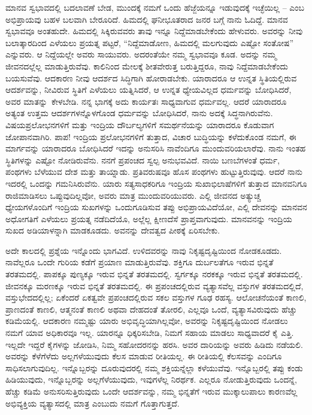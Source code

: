 ಮಾನವ ಸ್ವಭಾವದಲ್ಲಿ ಬದಲಾವಣೆ ಬೇಡ, ಮುಂದಕ್ಕೆ ನಮಗೆ ಒಂದು ಹೆಜ್ಜೆಯನ್ನೂ ಇಡುವುದಕ್ಕೆ ಇಚ್ಛೆಯಿಲ್ಲ – ಎಂಬ ಅಭಿಪ್ರಾಯವು ಬಹಳ ಬಲವಾಗಿ ಬೇರೂರಿದೆ. ಹಿಮದಲ್ಲಿ ಘನೀಭೂತರಾದ ಜನರ ಬಗ್ಗೆ ನಾನು ಓದಿದ್ದೆ. ಮಾನವ ಸ್ವಭಾವವೂ ಅಂತಹುದೇ. ಹಿಮದಲ್ಲಿ ಸಿಕ್ಕಿರುವವರು ತಾವು ಇನ್ನೂ ನಿದ್ದೆಮಾಡಬೇಕೆಂದು ಹೇಳುವರು. ಅವರನ್ನು ನೀವು ಬಲಾತ್ಕಾರದಿಂದ ಎಳೆಯಲು ಪ್ರಯತ್ನ ಪಟ್ಟರೆ, “ನಿದ್ದೆಮಾಡೋಣ, ಹಿಮದಲ್ಲಿ ಮಲಗುವುದು ಎಷ್ಟೋ ಸಂತೋಷ” ಎನ್ನುವರು. ಆ ನಿದ್ದೆಯಲ್ಲೇ ಅವರು ಸಾಯುವರು. ಅದರಂತೆಯೇ ನಮ್ಮ ಸ್ವಭಾವವೂ ಕೂಡ. ಅದನ್ನು ನಮ್ಮ ಜೀವನದಲ್ಲೆಲ್ಲ ಮಾಡುತ್ತಿರುವೆವು. ಕಾಲಿನಿಂದ ಮೇಲಕ್ಕೆ ಶೀತವೇರುತ್ತ ಬರುತ್ತಿದ್ದರೂ, ನಾವು ನಿದ್ದೆಮಾಡಬೇಕೆಂದು ಬಯಸುವೆವು. ಆದಕಾರಣ ನೀವು ಆದರ್ಶದ ಸಿದ್ಧಿಗಾಗಿ ಹೋರಾಡಬೇಕು. ಯಾರಾದರೂ ಆ ಉನ್ನತ ಸ್ಥಿತಿಯಲ್ಲಿರುವ ಆದರ್ಶವನ್ನು, ನೀವಿರುವ ಸ್ಥಿತಿಗೆ ಎಳೆಯಲು ಯತ್ನಿಸಿದರೆ, ಆ ಉನ್ನತ ಧ್ಯೇಯವಿಲ್ಲದ ಧರ್ಮವನ್ನು ಬೋಧಿಸಿದರೆ, ಅವರ ಮಾತನ್ನು\break\ ಕೇಳಬೇಡಿ. ನನ್ನ ಭಾಗಕ್ಕೆ ಅದು ಕಾರ್ಯತಃ ಸಾಧ್ಯವಾಗುವ ಧರ್ಮವಲ್ಲ. ಆದರೆ ಯಾರಾದರೂ ಅತ್ಯಂತ ಉತ್ತಮ ಆದರ್ಶಗಳನ್ನೊಳಗೊಂಡ ಧರ್ಮವನ್ನು ಬೋಧಿಸಿದರೆ, ನಾನು ಅದಕ್ಕೆ ಸಿದ್ಧನಾಗಿರುವೆನು. ವಿಷಯಪ್ರಲೋಭನಗಳಿಗೆ ಮತ್ತು ಇಂದ್ರಿಯ ದೌರ್ಬಲ್ಯಗಳಿಗೆ ಸಮರ್ಥನೆಯನ್ನು ಯಾರಾದರೂ ಕೊಡುವಾಗ ಜೋಪಾನವಾಗಿರಿ. ಪಾಪ! ಇಂದ್ರಿಯ ಪ್ರಲೋಭನಗಳಿಗೆ ತುತ್ತಾದ, ವಿಚಾರ ಬುದ್ಧಿಯನ್ನು ಕಳೆದುಕೊಂಡ ನಮಗೆ, ಈ ಮಾರ್ಗವನ್ನು ಯಾರಾದರೂ ಬೋಧಿಸಿದರೆ ಇದನ್ನು ಅನುಸರಿಸಿ ನಾವೆಂದಿಗೂ ಮುಂದುವರಿಯಲಾರೆವು. ನಾನು ಇಂತಹ ಸ್ಥಿತಿಗಳನ್ನು ಎಷ್ಟೋ ನೋಡಿರುವೆನು. ನನಗೆ ಪ್ರಪಂಚದ ಸ್ವಲ್ಪ ಅನುಭವವಿದೆ. ನಾಯಿ ಬಣಬೆಗಳಂತೆ ಧರ್ಮ, ಪಂಥಗಳು ಬೆಳೆಯುವ ದೇಶ ಮತ್ತು ತಾಯ್ನಾಡು. ಪ್ರತಿವರುಷವೂ ಹೊಸ ಪಂಥಗಳು ಹುಟ್ಟುತ್ತಿರುವುವು. ಆದರೆ ನಾನು ಇದರಲ್ಲಿ ಒಂದನ್ನು ಗಮನಿಸಿರುವೆನು. ಯಾರು ಸತ್ಯಸಾಧಕರಿಗೂ ಇಂದ್ರಿಯ ಸುಖಾಭಿಲಾಷೆಗಳಿಗೆ ತುತ್ತಾದ ಮಾನವನಿಗೂ ರಾಜಿಮಾಡಿಸಲು ಒಪ್ಪುವುದಿಲ್ಲವೋ, ಅವರು ಮಾತ್ರ ಮುಂದುವರಿಯುವರು. ಎಲ್ಲಿ ಜೀವನದ ಅತ್ಯುಚ್ಚ ಧ್ಯೇಯಗಳೊಂದಿಗೆ ಇಂದ್ರಿಯ ಸುಖಗಳನ್ನು ಒಂದುಗೂಡಿಸುವ ತಪ್ಪು ಅಭಿಪ್ರಾಯವಿದೆಯೋ, ಎಲ್ಲಿ ದೇವನನ್ನು ಮಾನವನ ಅಧೋಗತಿಗೆ ಎಳೆಯಲು ಪ್ರಯತ್ನ ನಡೆದಿದೆಯೊ, ಅಲ್ಲೆಲ್ಲ ಕ್ಷೀಣದೆಸೆ ಪ್ರಾಪ್ತವಾಗುವುದು. ಮಾನವನನ್ನು ಇಂದ್ರಿಯ ಸುಖದ ಅಡಿಯಾಳನ್ನಾಗಿ ಮಾಡಕೂಡದು. ಅವನನ್ನು ದೇವತ್ವದ ಪೀಠಕ್ಕೆ ಏರಿಸಬೇಕು. 



ಅದೇ ಕಾಲದಲ್ಲಿ ಪ್ರಶ್ನೆಯ ಇನ್ನೊಂದು ಭಾಗವಿದೆ. ಉಳಿದವರನ್ನು ನಾವು ನಿಕೃಷ್ಟದೃಷ್ಟಿಯಿಂದ ನೋಡಕೂಡದು. ನಾವೆಲ್ಲರೂ ಒಂದೇ ಗುರಿಯ ಕಡೆಗೆ ಪ್ರಯಾಣ ಮಾಡುತ್ತಿರುವೆವು. ಶಕ್ತಿಗೂ ದುರ್ಬಲತೆಗೂ ಇರುವ ಭಿನ್ನತೆ ತರತಮದಲ್ಲಿ. ಪಾಪಕ್ಕೂ ಪುಣ್ಯಕ್ಕೂ ಇರುವ ಭಿನ್ನತೆ ತರತಮದಲ್ಲಿ. ಸ್ವರ್ಗಕ್ಕೂ ನರಕಕ್ಕೂ ಇರುವ ಭಿನ್ನತೆ ತರತಮದಲ್ಲಿ. ಜೀವನಕ್ಕೂ ಮರಣಕ್ಕೂ ಇರುವ ಭಿನ್ನತೆ ತರತಮದಲ್ಲಿ. ಈ ಪ್ರಪಂಚದಲ್ಲಿರುವ ವ್ಯತ್ಯಾಸವೆಲ್ಲ ವಸ್ತುಗಳ ತರತಮದಲ್ಲಿದೆ, ವಸ್ತುಭೇದದಲ್ಲಿಲ್ಲ; ಏಕೆಂದರೆ ಏಕತ್ವವೇ ಪ್ರಪಂಚದಲ್ಲಿರುವ ಸಕಲ ವಸ್ತುಗಳ ಗೂಢ ರಹಸ್ಯ. ಆಲೋಚನೆಯಂತೆ ಕಾಣಲಿ, ಪ್ರಾಣದಂತೆ ಕಾಣಲಿ, ಆತ್ಮನಂತೆ ಕಾಣಲಿ ಅಥವಾ ದೇಹದಂತೆ ತೋರಲಿ, ಎಲ್ಲವೂ ಒಂದೆ, ವ್ಯತ್ಯಾಸವಿರುವುದು ಹೆಚ್ಚು ಕಡಿಮೆಯಲ್ಲಿ. ಆದಕಾರಣ ನಮ್ಮಷ್ಟು ಯಾರು ಅಭಿವೃದ್ಧಿಯಾಗಿಲ್ಲವೋ, ಅವರನ್ನು ನಿಕೃಷ್ಟದೃಷ್ಟಿಯಿಂದ ನೋಡಲು ನಮಗೆ ಯಾವ ಅಧಿಕಾರವೂ ಇಲ್ಲ. ಯಾರನ್ನೂ ಧಿಕ್ಕರಿಸಬೇಡಿ, ನಿಮಗೆ ಸಹಾಯ ಮಾಡಲು ಸಾಧ್ಯವಾದರೆ ಕೈ ಎತ್ತಿ. ಇಲ್ಲದೇ ಇದ್ದರೆ ಕೈಗಳನ್ನು ಜೋಡಿಸಿ, ನಿಮ್ಮ ಸಹೋದರನನ್ನು ಹರಸಿ. ಅವರ ದಾರಿಯನ್ನು ಅವರು ಹಿಡಿದು ನಡೆಯಲಿ. ಅವರನ್ನು ಕೆಳೆಗೆಳೆದು ಅಲ್ಲಗಳೆಯುವುದು ಕೆಲಸ ಮಾಡುವ ರೀತಿಯಲ್ಲ. ಈ ರೀತಿಯಲ್ಲಿ ಕೆಲಸವನ್ನು ಎಂದಿಗೂ ಸಾಧಿಸಲಾಗುವುದಿಲ್ಲ. ಇನ್ನೊಬ್ಬರನ್ನು ದೂರುವುದರಲ್ಲಿ ನಮ್ಮ ಶಕ್ತಿಯನ್ನೆಲ್ಲಾ ಕಳೆಯುವೆವು. ಇನ್ನೊಬ್ಬರಲ್ಲಿ ತಪ್ಪು ಕಂಡು ಹಿಡಿಯುವುದು, ಇನ್ನೊಬ್ಬರನ್ನು ಅಲ್ಲಗೆಳೆಯುವುದು, ಇವುಗಳೆಲ್ಲ ನಿರರ್ಥಕ. ಎಲ್ಲರೂ ನೋಡುತ್ತಿರುವುದು ಒಂದನ್ನೆ, ಹೆಚ್ಚು ಕಡಿಮೆ ಅನುಸರಿಸುತ್ತಿರುವುದು ಒಂದೇ ಆದರ್ಶವನ್ನು, ನಮ್ಮ ಭಿನ್ನತೆಗೆ ಇರುವ ಮುಕ್ಕಾಲುಪಾಲು ಕಾರಣವೆಲ್ಲ ಅಭಿವ್ಯಕ್ತಿಯ ವ್ಯತ್ಯಾಸದಲ್ಲಿ ಮಾತ್ರ ಎಂಬುದು ನಮಗೆ ಗೊತ್ತಾಗುತ್ತದೆ. 



